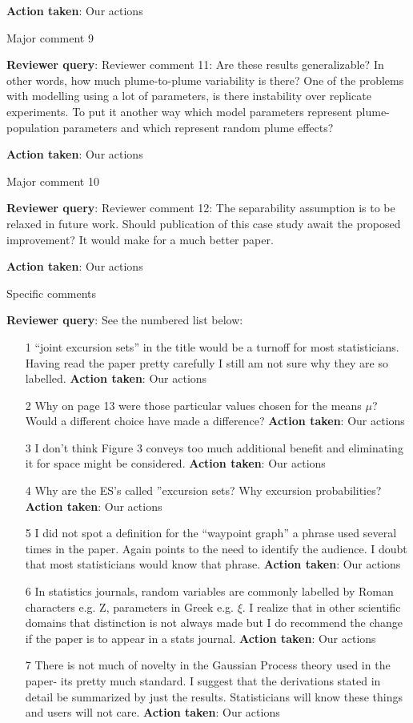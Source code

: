 \documentclass[a4paper]{article}
\def\reply{\textbf{Reviewer query}}
\def\action{\textbf{Action taken}}
\begin{document}
\begin{answers}
\action: Our actions

\item{Major comment 9}\label{q9}

\reply: Reviewer comment 11: Are these results generalizable? In other words, how much plume-to-plume variability is there? One of the problems with modelling using a lot of parameters, is there instability over replicate experiments. To put it another way which model parameters represent plume-population parameters and which represent random plume effects?

\action: Our actions

\item{Major comment 10}\label{q10}

\reply: Reviewer comment 12: The separability assumption is to be relaxed in future work. Should publication of this case study await the proposed improvement? It would make for a much better paper.

\action: Our actions

\item{Specific comments}\label{q11}

\reply: See the numbered list below:
\begin{itemize}[noitemsep,topsep=0pt,parsep=0pt,partopsep=0pt]

\item[1] “joint excursion sets” in the title would be a turnoff for most statisticians. Having read the paper pretty carefully I still am not sure why they are so labelled.
\action: Our actions
\item[2] Why on page 13 were those particular values chosen for the means $\mu$? Would a different choice have made a difference?
\action: Our actions
\item[3] I don’t think Figure 3 conveys too much additional benefit and eliminating it for space might be considered.
\action: Our actions
\item[4] Why are the ES’s called ”excursion sets? Why excursion probabilities?
\action: Our actions
\item[5] I did not spot a definition for the “waypoint graph” a phrase used several times in the paper. Again points to the need to identify the audience. I doubt that most statisticians would know that phrase. 
\action: Our actions
\item[6] In statistics journals, random variables are commonly labelled by Roman characters e.g. Z, parameters in Greek e.g. $\xi$. I realize that in other scientific domains that distinction is not always made but I do recommend the change if the paper is to appear in a stats journal. 
\action: Our actions
\item[7] There is not much of novelty in the Gaussian Process theory used in the paper- its pretty much standard. I suggest that the derivations stated in detail be summarized by just the results. Statisticians will know these things and users will not care.
\action: Our actions

\end{itemize}

\end{answers}
\end{document}
